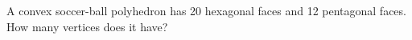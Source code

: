 A convex soccer-ball polyhedron has 20 hexagonal faces and 12 pentagonal faces. How many vertices does it have?
